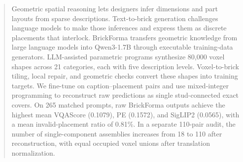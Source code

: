 \begin{abstract}
Geometric spatial reasoning lets designers infer dimensions and part layouts from sparse descriptions. Text-to-brick generation challenges language models to make those inferences and express them as discrete placements that interlock. BrickForma transfers geometric knowledge from large language models into Qwen3-1.7B through executable training-data generators. LLM-assisted parametric programs synthesize 80,000 voxel shapes across 21 categories, each with five description levels. Voxel-to-brick tiling, local repair, and geometric checks convert these shapes into training targets. We fine-tune on caption--placement pairs and use mixed-integer programming to reconstruct raw predictions as single stud-connected exact covers. On 265 matched prompts, raw BrickForma outputs achieve the highest mean VQAScore (0.1079), PE (0.1572), and SigLIP2 (0.0565), with a mean invalid-placement ratio of 0.81\%. In a separate 110-pair audit, the number of single-component assemblies increases from 18 to 110 after reconstruction, with equal occupied voxel unions after translation normalization.
\end{abstract}
